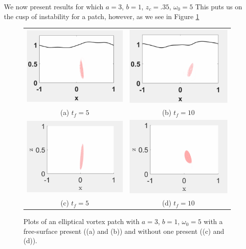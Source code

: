 \documentclass[a4paper,11pt]{article}
\begin{document}
We now present results for which $a=3$, $b=1$, $z_{c}=.35$, $\omega_{0}=5$  This puts us on the cusp of  instability for a patch, however, as we see in Figure \ref{fig:vortprofiles}
\begin{figure}[!h]
\begin{tabular}{cc}
\includegraphics[width=.5\textwidth]{rows_400_cols_800_K_128_mu_pt1_gam_pt31623_F_pt23843_tf_5.png}	& \includegraphics[width=.5\textwidth]{rows_400_cols_800_K_128_mu_pt1_gam_pt31623_F_pt23843_tf_10}\\
(a) $t_{f}=5$ & (b) $t_{f}=10$\\
\includegraphics[width=.5\textwidth]{rows_400_cols_800_mu_pt1_gam_pt31623_F_pt23843_tf_5.png}	& \includegraphics[width=.5\textwidth]{rows_400_cols_800_mu_pt1_gam_pt31623_F_pt23843_tf_10}\\
(c) $t_{f}=5$& (d) $t_{f}=10$
\end{tabular}	
\caption{Plots of an elliptical vortex patch with $a=3$, $b=1$, $\omega_{0}=5$ with a free-surface present ((a) and (b)) and without one present ((c) and (d)).  }
\label{fig:vortprofiles}
\end{figure}  


\end{document}
